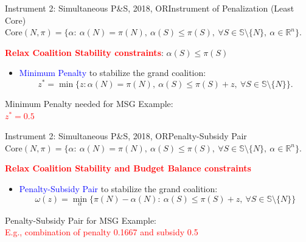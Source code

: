 \documentclass[14pt]{beamer}
\newcommand{\R}{\mathbb{R}}
\begin{document}
\begin{frame}{Instrument 2: Simultaneous P\&S, {\footnotesize 2018, OR}}{Instrument of Penalization (Least Core)}
\vspace{3mm}
{\footnotesize $\mathrm{Core}(N,\pi) = \bigg\{ \alpha:~ \alpha(N)=\pi(N), ~\alpha(S) \leq \pi(S), ~\forall S \in \mathbb{S} \setminus \{N\},~\alpha \in \R^n   \bigg\}$.}
\begin{shaded}
\centering \textcolor{red}{\bf Relax Coalition Stability constraints}: $\alpha(S) \leq \pi(S)$
\end{shaded}
\begin{itemize}
\item \textcolor{blue}{Minimum Penalty} to stabilize the grand coalition:
\small
\begin{equation*}
z^* = \min \big\{ z:\alpha(N)= \pi(N),~\alpha(S) \leq \pi(S)+z, ~\forall S \in \mathbb{S} \setminus \{N\} \big\}.
\end{equation*}
\end{itemize}
\pause
\vspace{-7mm}
\begin{shaded}
\centering
\small
Minimum Penalty needed for MSG Example:\\
\vspace{2mm}
\textcolor{red}{$z^* = 0.5$}
\end{shaded}
\end{frame}



\begin{frame}{Instrument 2: Simultaneous P\&S, {\footnotesize 2018, OR}}{Penalty-Subsidy Pair}
\vspace{3mm}
{\footnotesize $\mathrm{Core}(N,\pi) = \bigg\{ \alpha:~ \alpha(N)=\pi(N), ~\alpha(S) \leq \pi(S), ~\forall S \in \mathbb{S} \setminus \{N\},~\alpha \in \R^n   \bigg\}$.}
\begin{shaded}
\centering \textcolor{red}{\bf \small Relax Coalition Stability and Budget Balance constraints}
\end{shaded}
\begin{itemize}
\item \textcolor{blue}{Penalty-Subsidy Pair} to stabilize the grand coalition:
\small
\begin{equation*}
\omega(z) = \min_{\alpha} \bigg\{ \pi(N) - \alpha(N):~\alpha(S) \leq \pi(S)+z,~\forall S \in \mathbb{S} \setminus \{N\} \bigg\}
\end{equation*}
\end{itemize}
\pause
\vspace{-7mm}
\begin{shaded}
\centering
\small
Penalty-Subsidy Pair for MSG Example:\\
\vspace{2mm}
\textcolor{red}{E.g., combination of penalty 0.1667 and subsidy 0.5}
\end{shaded}
\end{frame}
\end{document}
